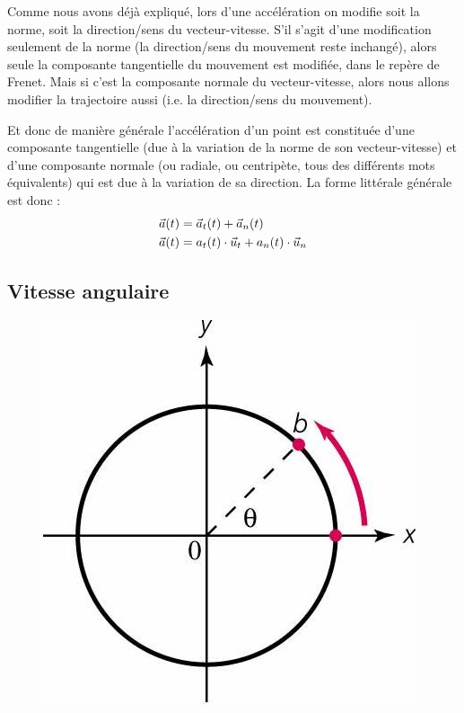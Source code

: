 \documentclass[11pt,a4paper]{article}
\begin{document}
Comme nous avons déjà expliqué, lors d’une accélération on modifie soit la norme, soit la direction/sens du vecteur-vitesse. S’il s’agit d’une modification seulement de la norme (la direction/sens du mouvement reste inchangé), alors seule la composante tangentielle du mouvement est modifiée, dans le repère de Frenet. Mais si c’est la composante normale du vecteur-vitesse, alors nous allons modifier la trajectoire aussi (i.e. la direction/sens du mouvement).   

Et donc de manière générale l'accélération d'un point est constituée d'une composante tangentielle (due à la variation de la norme de son vecteur-vitesse) et d'une composante normale (ou radiale, ou centripète, tous des différents mots équivalents) qui est due à la variation de sa direction. La forme littérale générale est donc :
\begin{align*}
    \vec{a}(t) &= \vec{a}_t(t) + \vec{a}_n(t) \\
    \vec{a}(t) &= a_t(t)\cdot \vec{u}_t + a_n(t)\cdot \vec{u}_n \\
\end{align*}
\subsection{Vitesse angulaire}

\begin{figure}
    \centering
    \includegraphics[width=.95\linewidth]{imgs/p1/rads.jpg}
\end{figure}
\end{document}
